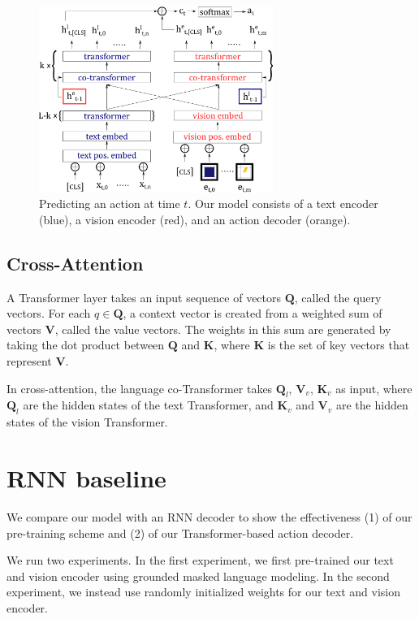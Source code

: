 \documentclass[11pt]{article}
\begin{document}
\begin{figure}
\includegraphics[width=3in]{training_model.png}
\caption{Predicting an action at time $t$. Our model consists of a text encoder (blue), a vision encoder (red), and an action decoder (orange). }
\label{fig:training_model}	
\end{figure}

\subsection{Cross-Attention}
A Transformer layer takes an input sequence of vectors $\mathbf{Q}$, called the query vectors. 
%
For each $q\in \mathbf{Q}$, a context vector is created from a weighted sum of vectors $\mathbf{V}$, called the value vectors.
%
The weights in this sum are generated by taking the dot product between $\mathbf{Q}$ and $\mathbf{K}$, where $\mathbf{K}$ is the set of key vectors that represent $\mathbf{V}$.

In cross-attention, the language co-Transformer takes $\mathbf{Q}_{l}$, $\mathbf{V}_{v}$, $\mathbf{K}_{v}$ as input, where $\mathbf{Q}_l$ are the hidden states of the text Transformer, and $\mathbf{K}_{v}$ and $\mathbf{V}_{v}$ are the hidden states of the vision Transformer.

\section{RNN baseline}
We compare our model with an RNN decoder to show the effectiveness (1) of our pre-training scheme and (2) of our Transformer-based action decoder.
%

We run two experiments.
%
In the first experiment, we first pre-trained our text and vision encoder using grounded masked language modeling. 
%
In the second experiment, we instead use randomly initialized weights for our text and vision encoder.
\end{document}
